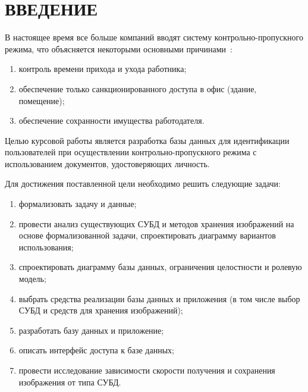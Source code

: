 \chapter*{ВВЕДЕНИЕ}

В настоящее время все больше компаний вводят систему контрольно-пропускного режима, что объясняется некоторыми основными причинами~\cite{introCPP}:
\begin{enumerate}
	\item контроль времени прихода и ухода работника;
	\item обеспечение только санкционированного доступа в офис (здание, помещение);
	\item обеспечение сохранности имущества работодателя.
\end{enumerate}

Целью курсовой работы является разработка базы данных для идентификации пользователей при осуществлении контрольно-пропускного режима с использованием документов, удостоверяющих личность.

Для достижения поставленной цели необходимо решить следующие задачи:
\begin{enumerate}
	\item формализовать задачу и данные;
	\item провести анализ существующих СУБД и методов хранения изображений на основе
	формализованной задачи, спроектировать диаграмму вариантов использования;
	\item спроектировать диаграмму базы данных, ограничения целостности и ролевую модель;
	\item выбрать средства реализации базы данных и приложения (в том числе выбор СУБД и средств для хранения изображений);
	\item разработать базу данных и приложение;
	\item описать интерфейс доступа к базе данных;
	\item провести исследование зависимости скорости получения и сохранения изображения от типа СУБД.
\end{enumerate}